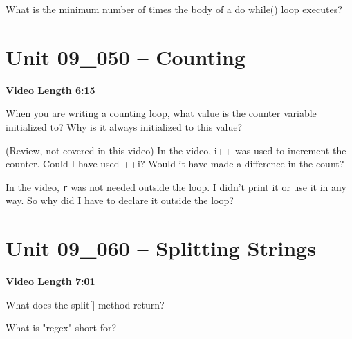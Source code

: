 \documentclass[letterpaper,12pt]{exam}
\newcommand{\unit}{Unit 09}
\begin{document}
\begin{questions}
\begin{samepage}
    \question What is the minimum number of times the body of a do{} while() loop executes?
    \vspace{5mm}
\end{samepage}



\section*{\unit\_050 -- Counting} 
\par{\selectfont\textbf{Video Length 6:15}}

\begin{samepage}
    \question When you are writing a counting loop, what value is the counter variable initialized to?  Why is it always initialized to this value?
    \vspace{5mm}
\end{samepage}
\begin{samepage}
    \question (Review, not covered in this video)  In the video, i++ was used to increment the counter.  Could I have used ++i?  Would it have made a difference in the count?
    \vspace{5mm}
\end{samepage}

\begin{samepage}
    \question In the video, \texttt{\textbf{r}} was not needed outside the loop.  I didn't print it or use it in any way.  So why did I have to declare it outside the loop?
    \vspace{5mm}
\end{samepage}



\section*{\unit\_060 -- Splitting Strings} 
\par{\selectfont\textbf{Video Length 7:01}}

\begin{samepage}
    \question What does the split[] method return?
    \vspace{5mm}
\end{samepage}

\begin{samepage}
    \question What is "regex" short for?
    \vspace{5mm}
\end{samepage}


\end{questions}
\end{document}
